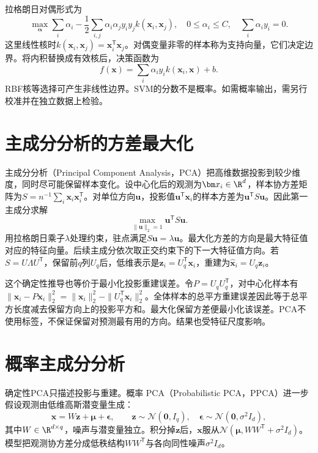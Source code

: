 拉格朗日对偶形式为
\begin{equation}
 \max_{\bm\alpha}\sum_i\alpha_i-\frac12\sum_{i,j}\alpha_i\alpha_jy_iy_jk(\bm x_i,\bm x_j),
 \quad 0\leq\alpha_i\leq C,\quad \sum_i\alpha_iy_i=0.
 \label{eq:svm-dual}
\end{equation}
这里线性核时$k(\bm x_i,\bm x_j)=\bm x_i^{\mathsf T}\bm x_j$。对偶变量非零的样本称为支持向量，它们决定边界。将内积替换成有效核后，决策函数为
\begin{equation}
 f(\bm x)=\sum_i\alpha_i y_i k(\bm x_i,\bm x)+b.
\end{equation}
RBF核等选择可产生非线性边界。SVM的分数不是概率。如需概率输出，需另行校准并在独立数据上检验。

\section{主成分分析的方差最大化}
主成分分析（Principal Component Analysis，PCA）把高维数据投影到较少维度，同时尽可能保留样本变化。设中心化后的观测为$\bm x_i\in\R^d$，样本协方差矩阵为$S=n^{-1}\sum_i\bm x_i\bm x_i^{\mathsf T}$。对单位方向$\bm u$，投影值$\bm u^{\mathsf T}\bm x_i$的样本方差为$\bm u^{\mathsf T}S\bm u$。因此第一主成分求解
\begin{equation}
 \max_{\|\bm u\|_2=1}\bm u^{\mathsf T}S\bm u.
\end{equation}
用拉格朗日乘子$\lambda$处理约束，驻点满足$S\bm u=\lambda\bm u$。最大化方差的方向是最大特征值对应的特征向量。后续主成分依次取正交约束下的下一大特征值方向。若$S=U\Lambda U^{\mathsf T}$，保留前$q$列$U_q$后，低维表示是$\bm z_i=U_q^{\mathsf T}\bm x_i$，重建为$\hat{\bm x}_i=U_q\bm z_i$。

这个确定性推导也等价于最小化投影重建误差。令$P=U_qU_q^{\mathsf T}$，对中心化样本有$\|\bm x_i-P\bm x_i\|_2^2=\|\bm x_i\|_2^2-\|U_q^{\mathsf T}\bm x_i\|_2^2$。全体样本的总平方重建误差因此等于总平方长度减去保留方向上的投影平方和。最大化保留方差便最小化该误差。PCA不使用标签，不保证保留对预测最有用的方向。结果也受特征尺度影响。

\section{概率主成分分析}
确定性PCA只描述投影与重建。概率 PCA（Probabilistic PCA，PPCA）进一步假设观测由低维高斯潜变量生成：
\begin{equation}
 \bm x=W\bm z+\bm\mu+\bm\epsilon,\qquad
 \bm z\sim\mathcal N(\bm0,I_q),\quad
 \bm\epsilon\sim\mathcal N(\bm0,\sigma^2I_d),
 \label{eq:ppca-generative-model}
\end{equation}
其中$W\in\R^{d\times q}$，噪声与潜变量独立。积分掉$\bm z$后，$\bm x$服从$\mathcal N(\bm\mu,WW^{\mathsf T}+\sigma^2I_d)$。模型把观测协方差分成低秩结构$WW^{\mathsf T}$与各向同性噪声$\sigma^2I_d$。

